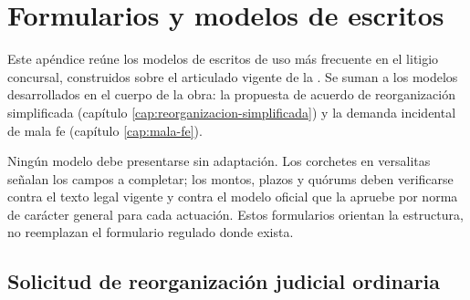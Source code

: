 \chapter{Formularios y modelos de escritos}
\label{ap:formularios}

Este apéndice reúne los modelos de escritos de uso más frecuente en el litigio concursal,
construidos sobre el articulado vigente de la \LIR{}. Se suman a los modelos desarrollados
en el cuerpo de la obra: la propuesta de acuerdo de reorganización simplificada (capítulo
\ref{cap:reorganizacion-simplificada}) y la demanda incidental de mala fe (capítulo
\ref{cap:mala-fe}).

\begin{alerta}
Ningún modelo debe presentarse sin adaptación. Los corchetes en versalitas señalan los
campos a completar; los montos, plazos y quórums deben verificarse contra el texto legal
vigente y contra el modelo oficial que la \superir{} apruebe por norma de carácter general
para cada actuación. Estos formularios orientan la estructura, no reemplazan el formulario
regulado donde exista.
\end{alerta}

\section{Solicitud de reorganización judicial ordinaria}

